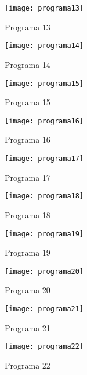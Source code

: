 \documentclass[a4paper,11pt,fleqn]{article}
\begin{document}
\newpage
{}

\begin{figure}[!ht]
    \caption{Programa 13}
    \centering
    \texttt{[image: programa13]}
\end{figure}

\begin{figure}[!ht]
    \caption{Programa 14}
    \centering
    \texttt{[image: programa14]}
\end{figure} 

\begin{figure}[!ht]
    \caption{Programa 15}
    \centering
    \texttt{[image: programa15]}
\end{figure}

\begin{figure}[!ht]
    \caption{Programa 16}
    \centering
    \texttt{[image: programa16]}
\end{figure} 

\begin{figure}[!ht]
    \caption{Programa 17}
    \centering
    \texttt{[image: programa17]}
\end{figure}

\begin{figure}[!ht]
    \caption{Programa 18}
    \centering
    \texttt{[image: programa18]}
\end{figure}

\begin{figure}[!ht]
    \caption{Programa 19}
    \centering
    \texttt{[image: programa19]}
\end{figure}

\begin{figure}[!ht]
    \caption{Programa 20}
    \centering
    \texttt{[image: programa20]}
\end{figure}    

\begin{figure}[!ht]
    \caption{Programa 21}
    \centering
    \texttt{[image: programa21]}
\end{figure}

\begin{figure}[!ht]
    \caption{Programa 22}
    \centering
    \texttt{[image: programa22]}
\end{figure} 
\end{document}
